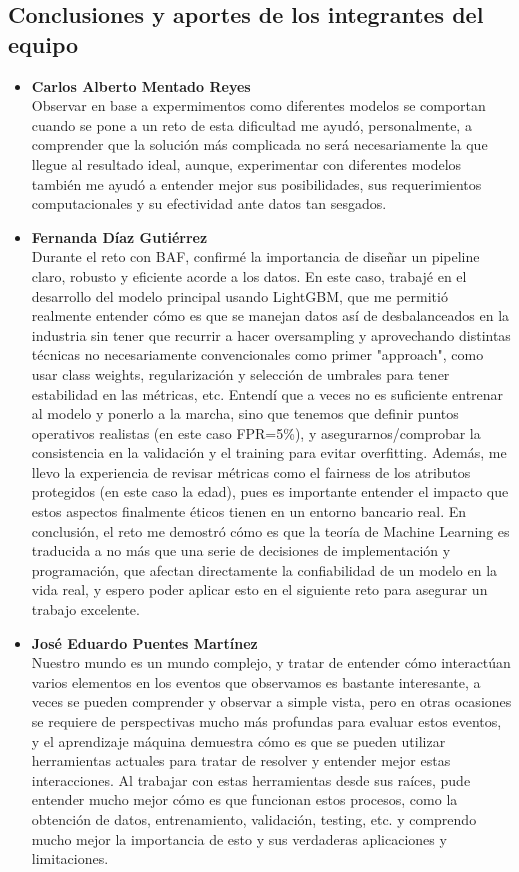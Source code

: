 \documentclass[runningheads]{llncs}
\begin{document}
\subsection{Conclusiones y aportes de los integrantes del equipo}

\begin{itemize}

 \item \textbf{Carlos Alberto Mentado Reyes} \\
    Observar en base a expermimentos como diferentes modelos se comportan cuando se pone a un reto de esta dificultad me ayudó, personalmente, a comprender que la solución más complicada no será necesariamente la que llegue al resultado ideal, aunque, experimentar con diferentes modelos también me ayudó a entender mejor sus posibilidades, sus requerimientos computacionales y su efectividad ante datos tan sesgados.  
    \item \textbf{Fernanda Díaz Gutiérrez} \\
    Durante el reto con BAF, confirmé la importancia de diseñar un pipeline claro, robusto y eficiente acorde a los datos. En este caso, trabajé en el desarrollo del modelo principal usando LightGBM, que me permitió realmente entender cómo es que se manejan datos así de desbalanceados en la industria sin tener que recurrir a hacer oversampling y aprovechando distintas técnicas no necesariamente convencionales como primer "approach", como usar class weights, regularización y selección de umbrales para tener estabilidad en las métricas, etc. 
    Entendí que a veces no es suficiente entrenar al modelo y ponerlo a la marcha, sino que tenemos que definir puntos operativos realistas (en este caso FPR=5\%), y asegurarnos/comprobar la consistencia en la validación y el training para evitar overfitting. 
    Además, me llevo la experiencia de revisar métricas como el fairness de los atributos protegidos (en este caso la edad), pues es importante entender el impacto que estos aspectos finalmente éticos tienen en un entorno bancario real.
    En conclusión, el reto me demostró cómo es que la teoría de Machine Learning es traducida a no más que una serie de decisiones de implementación y programación, que afectan directamente la confiabilidad de un modelo en la vida real, y espero poder aplicar esto en el siguiente reto para asegurar un trabajo excelente.
    \item \textbf{José Eduardo Puentes Martínez} \\
    Nuestro mundo es un mundo complejo, y tratar de entender cómo interactúan varios elementos en los eventos que observamos es bastante interesante, a veces se pueden comprender y observar a simple vista, pero en otras ocasiones se requiere de perspectivas mucho más profundas para evaluar estos eventos, y el aprendizaje máquina demuestra cómo es que se pueden utilizar herramientas actuales para tratar de resolver y entender mejor estas interacciones. Al trabajar con estas herramientas desde sus raíces, pude entender mucho mejor cómo es que funcionan estos procesos, como la obtención de datos, entrenamiento, validación, testing, etc. y comprendo mucho mejor la importancia de esto y sus verdaderas aplicaciones y limitaciones.

\end{itemize}
\end{document}
